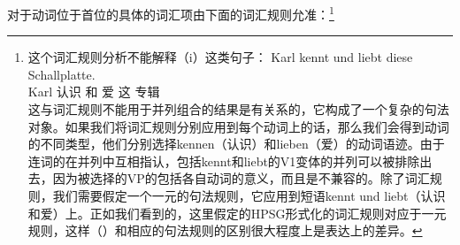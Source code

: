 对于动词位于首位的具体的词汇项由下面的词汇规则允准：\footnote{%
这个词汇规则分析不能解释（i）这类句子：
\ea
\gll Karl kennt und liebt diese Schallplatte.\\
	 Karl 认识 和 爱 这 专辑\\
\z
这与词汇规则不能用于并列组合的结果是有关系的，它构成了一个复杂的句法对象。如果我们将词汇规则分别应用到每个动词上的话，那么我们会得到动词的不同类型，他们分别选择kennen（认识）和lieben（爱）的动词语迹。由于连词的\catvsc 在并列中互相指认，包括kennt和liebt的V1变体的并列可以被排除出去，因为被选择的VP的\dslvsc 包括各自动词的意义，而且是不兼容的\citep[]{Mueller2005c}。除了词汇规则，我们需要假定一个一元的句法规则，它应用到短语kennt und liebt（认识和爱）上。正如我们看到的，这里假定的HPSG形式化的词汇规则对应于一元规则，这样（）和相应的句法规则的区别很大程度上是表达上的差异。
}
\eas
\label{lr-verb-movement}

